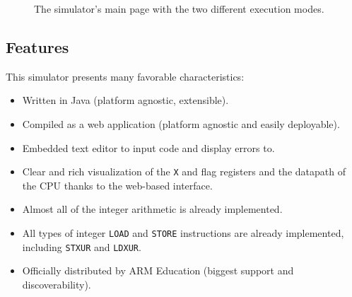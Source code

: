 \begin{figure}[H]
	\centering
	
	\caption{The simulator's main page with the two different execution modes.}
\end{figure}

\subsection*{Features}

This simulator presents many favorable characteristics:

\begin{itemize}
	\item Written in Java (platform agnostic, extensible).
	\item Compiled as a web application (platform agnostic and easily deployable).
	\item Embedded text editor to input code and display errors to.
	\item Clear and rich visualization of the \verb|X| and flag registers and the datapath of the CPU thanks to the web-based interface.
	\item Almost all of the integer arithmetic is already implemented.
	\item All types of integer \verb|LOAD| and \verb|STORE| instructions are already implemented, including \verb|STXUR| and \verb|LDXUR|.
	\item Officially distributed by ARM Education (biggest support and discoverability).
\end{itemize}


